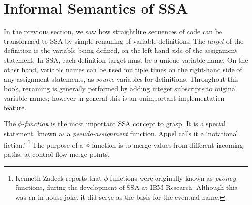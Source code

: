 


\section{Informal Semantics of SSA}



In the previous section, we saw how straightline sequences of code
can be transformed to SSA by simple renaming of variable definitions.
The \textit{target} of the definition is the variable being defined, on the
left-hand side of the assignment statement.
In SSA, each definition target must be a unique variable name.
On the other hand, variable names can be used multiple times
on the right-hand side of any assignment statements, as 
\textit{source} variables for definitions.
Throughout this book, renaming is generally performed by 
adding integer subscripts to original variable names;
however in general this is an unimportant implementation feature.


The \textit{$\phi$-function} is the most important SSA concept to grasp.
It is a special statement, known as a
\textit{pseudo-assignment} function.
Appel \cite{appel97modern} calls it a `notational fiction.'
\footnote{
%
%
Kenneth Zadeck reports that $\phi$-functions were originally
known as \textit{phoney}-functions, during the development
of SSA at IBM Research. Although this was an in-house joke,
it did serve as the basis for the eventual name.
}
The purpose of a $\phi$-function is to merge
values from different incoming paths, at control-flow
merge points.

